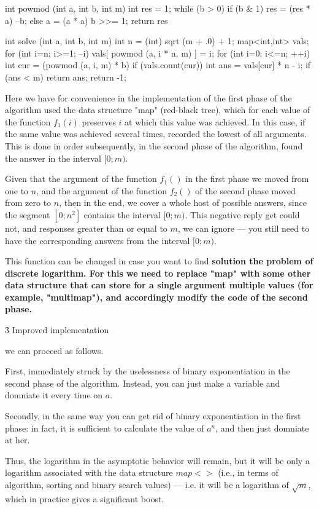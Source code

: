 \code
int powmod (int a, int b, int m) {
int res = 1;
while (b > 0)
if (b & 1) {
res = (res * a) %
--b;
}
else {
a = (a * a) %
b >>= 1;
}
return res %
}

int solve (int a, int b, int m) {
int n = (int) sqrt (m + .0) + 1;
map<int,int> vals;
for (int i=n; i>=1; --i)
vals[ powmod (a, i * n, m) ] = i;
for (int i=0; i<=n; ++i) {
int cur = (powmod (a, i, m) * b) %
if (vals.count(cur)) {
int ans = vals[cur] * n - i;
if (ans < m)
return ans;
}
}
return -1;
}
\endcode

Here we have for convenience in the implementation of the first phase of the algorithm used the data structure "map" (red-black tree), which for each value of the function $f_1(i)$ preserves $i$ at which this value was achieved. In this case, if the same value was achieved several times, recorded the lowest of all arguments. This is done in order subsequently, in the second phase of the algorithm, found the answer in the interval $[0;m)$.

Given that the argument of the function $f_1()$ in the first phase we moved from one to $n$, and the argument of the function $f_2()$ of the second phase moved from zero to $n$, then in the end, we cover a whole host of possible answers, since the segment $[0; n^2]$ contains the interval $[0;m)$. This negative reply get could not, and responses greater than or equal to $m$, we can ignore --- you still need to have the corresponding answers from the interval $[0;m)$.

This function can be changed in case you want to find \bf{solution} the problem of discrete logarithm. For this we need to replace "map" with some other data structure that can store for a single argument multiple values (for example, "multimap"), and accordingly modify the code of the second phase.


\h3{ Improved implementation }

 we can proceed as follows.

First, immediately struck by the uselessness of binary exponentiation in the second phase of the algorithm. Instead, you can just make a variable and domniate it every time on $a$.

Secondly, in the same way you can get rid of binary exponentiation in the first phase: in fact, it is sufficient to calculate the value of $a^n$, and then just domniate at her.

Thus, the logarithm in the asymptotic behavior will remain, but it will be only a logarithm associated with the data structure $map<>$ (i.e., in terms of algorithm, sorting and binary search values) --- i.e. it will be a logarithm of $\sqrt{m}$, which in practice gives a significant boost.

